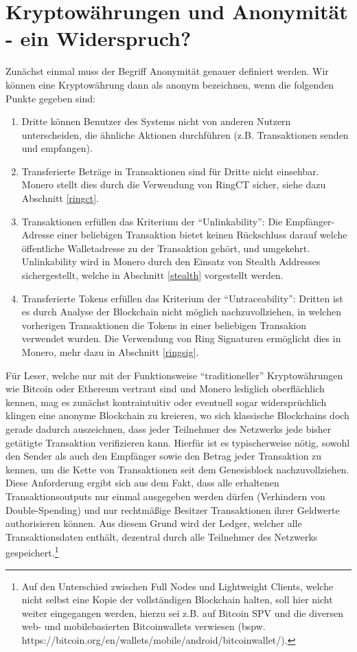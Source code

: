 \chapter{Kryptowährungen und Anonymität - ein Widerspruch?} \label{anonymity}
Zunächst einmal muss der Begriff Anonymität genauer definiert werden. Wir können eine Kryptowährung dann als anonym bezeichnen,
wenn die folgenden Punkte gegeben sind: 
\begin{enumerate}
    \item Dritte können Benutzer des Systems nicht von anderen Nutzern unterscheiden, die ähnliche Aktionen durchführen (z.B. Transaktionen senden und empfangen)\cite{Bleumer2011b}.
    \item Transferierte Beträge in Transaktionen sind für Dritte nicht einsehbar. Monero stellt dies durch die Verwendung von RingCT sicher, siehe dazu Abschnitt \ref{ringct}.
    \item Transaktionen erfüllen das Kriterium der ``Unlinkability'': Die Empfänger-Adresse einer beliebigen Transaktion bietet keinen Rückschluss darauf welche öffentliche Walletadresse zu der Transaktion gehört, und umgekehrt\cite{Bleumer2011a}.
    Unlinkability wird in Monero durch den Einsatz von Stealth Addresses sichergestellt\cite{MP}, welche in Abschnitt \ref{stealth} vorgestellt werden.
    \item Transferierte Tokens erfüllen das Kriterium der ``Untraceability'': Dritten ist es durch Analyse der Blockchain nicht möglich nachzuvollziehen, in welchen vorherigen Transaktionen die Tokens in einer beliebigen Transakion verwendet wurden\cite{Bleumer2011}.
    Die Verwendung von Ring Signaturen ermöglicht dies in Monero, mehr dazu in Abschnitt \ref{ringsig}.
\end{enumerate} 

Für Leser, welche nur mit der Funktionsweise ``traditioneller'' Kryptowährungen wie Bitcoin oder Ethereum vertraut sind und Monero lediglich oberflächlich kennen, 
mag es zunächst kontraintuitiv oder eventuell sogar widersprüchlich klingen eine anonyme Blockchain zu kreieren, wo sich klassische Blockchains doch gerade dadurch auszeichnen,
dass jeder Teilnehmer des Netzwerks jede bisher getätigte Transaktion verifizieren kann. Hierfür ist es typischerweise nötig, sowohl den Sender als auch den Empfänger sowie
den Betrag jeder Transaktion zu kennen, um die Kette von Transaktionen seit dem Genesisblock nachzuvollziehen. Diese Anforderung ergibt sich aus dem Fakt, dass alle erhaltenen Transaktionsoutputs nur einmal
ausgegeben werden dürfen (Verhindern von Double-Spending) und nur rechtmäßige Besitzer Transaktionen ihrer Geldwerte authorisieren können. Aus diesem Grund wird der Ledger, welcher alle Transaktionsdaten enthält,
dezentral durch alle Teilnehmer des Netzwerks gespeichert.\footnote{Auf den Unterschied zwischen Full Nodes und Lightweight Clients, welche nicht selbst eine Kopie der vollständigen
Blockchain halten, soll hier nicht weiter eingegangen werden, hierzu sei z.B. auf Bitcoin SPV und die diversen web- und mobilebasierten Bitcoinwallets verwiesen (bspw. https://bitcoin.org/en/wallets/mobile/android/bitcoinwallet/). }\\

